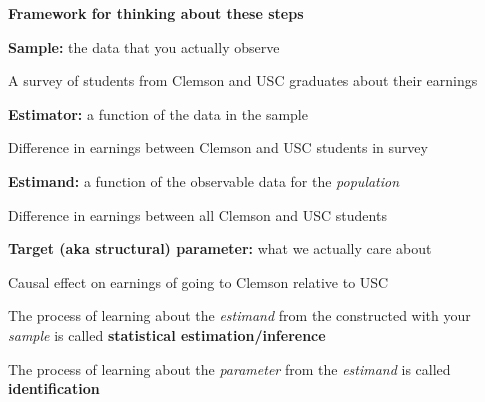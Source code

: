 \documentclass[11pt, aspectratio=169]{beamer}
\newenvironment{wideitemize}{\itemize\addtolength{\itemsep}{5pt}}{\enditemize}
\begin{document}
\begin{frame}{\bf \large Framework for thinking about these steps}
	
\begin{wideitemize}

\item \textbf{Sample:} the data that you actually observe
	\begin{wideitemize}
		\item
		A survey of students from Clemson and USC graduates about their earnings 
	\end{wideitemize}

\item \textbf{Estimator:} a function of the data in the sample 
	\begin{wideitemize}
		\item Difference in earnings between Clemson and USC students in survey
	\end{wideitemize}

\item \textbf{Estimand:} a function of the observable data for the \textit{population}
	\begin{wideitemize}
		\item Difference in earnings between all Clemson and USC students 
	\end{wideitemize}

\item \textbf{Target (aka structural) parameter:} what we actually care about
	\begin{wideitemize}
		\item Causal effect on earnings of going to Clemson relative to USC
	\end{wideitemize}

\end{wideitemize}	

\medskip
\pause
\begin{wideitemize}

\item The process of learning about the \textit{estimand} from the  constructed with your \textit{sample} is called \textbf{statistical estimation/inference}

\item The process of learning about the \textit{parameter} from the \textit{estimand} is called \textbf{identification}

\end{wideitemize}	
\end{frame}
\end{document}
